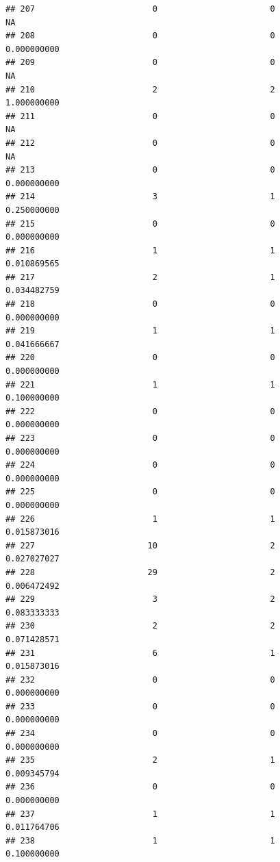 \documentclass[
]{article}
\begin{document}
\begin{verbatim}
## 207                        0                       0                        NA
## 208                        0                       0               0.000000000
## 209                        0                       0                        NA
## 210                        2                       2               1.000000000
## 211                        0                       0                        NA
## 212                        0                       0                        NA
## 213                        0                       0               0.000000000
## 214                        3                       1               0.250000000
## 215                        0                       0               0.000000000
## 216                        1                       1               0.010869565
## 217                        2                       1               0.034482759
## 218                        0                       0               0.000000000
## 219                        1                       1               0.041666667
## 220                        0                       0               0.000000000
## 221                        1                       1               0.100000000
## 222                        0                       0               0.000000000
## 223                        0                       0               0.000000000
## 224                        0                       0               0.000000000
## 225                        0                       0               0.000000000
## 226                        1                       1               0.015873016
## 227                       10                       2               0.027027027
## 228                       29                       2               0.006472492
## 229                        3                       2               0.083333333
## 230                        2                       2               0.071428571
## 231                        6                       1               0.015873016
## 232                        0                       0               0.000000000
## 233                        0                       0               0.000000000
## 234                        0                       0               0.000000000
## 235                        2                       1               0.009345794
## 236                        0                       0               0.000000000
## 237                        1                       1               0.011764706
## 238                        1                       1               0.100000000

\end{verbatim}
\end{document}
